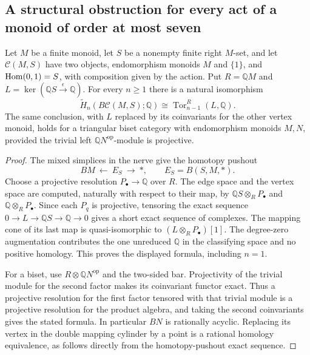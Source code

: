 \subsection{A structural obstruction for every act of a monoid of order at most seven}

\begin{lemma}
\label{C:act-cone-Tor}
Let $M$ be a finite monoid, let $S$ be a nonempty finite right
$M$-set, and let $\mathcal C(M,S)$ have two objects, endomorphism
monoids $M$ and $\{1\}$, and $\operatorname{Hom}(0,1)=S$, with composition given
by the action. Put $R=\mathbb QM$ and
$L=\ker(\mathbb QS\xrightarrow{\epsilon}\mathbb Q)$.
For every $n\geq1$ there is a natural isomorphism
\[
 \widetilde H_n(B\mathcal C(M,S);\mathbb Q)
 \cong\operatorname{Tor}^{R}_{n-1}(L,\mathbb Q).
\]
The same conclusion, with $L$ replaced by its coinvariants for the
other vertex monoid, holds for a triangular biset category with
endomorphism monoids $M,N$, provided the trivial left
$\mathbb QN^{\mathrm{op}}$-module is projective.
\end{lemma}
\begin{proof}
The mixed simplices in the nerve give the homotopy pushout
\[
 BM\ \longleftarrow\ E_S\ \longrightarrow\ *,
 \qquad E_S=B(S,M,*).
\]
Choose a projective resolution $P_\bullet\to\mathbb Q$ over $R$.
The edge space and the vertex space are computed, naturally with
respect to their map, by
$\mathbb QS\otimes_R P_\bullet$ and
$\mathbb Q\otimes_R P_\bullet$.
Since each $P_q$ is projective, tensoring the exact sequence
$0\to L\to\mathbb QS\to\mathbb Q\to0$ gives a short exact
sequence of complexes. The mapping cone of its last map is
quasi-isomorphic to $(L\otimes_R P_\bullet)[1]$.
The degree-zero augmentation contributes the one unreduced
$\mathbb Q$ in the classifying space and no positive homology.
This proves the displayed formula, including $n=1$.

For a biset, use $R\otimes\mathbb QN^{\mathrm{op}}$ and the
two-sided bar. Projectivity of the trivial module for the second
factor makes its coinvariant functor exact. Thus a projective
resolution for the first factor tensored with that trivial module
is a projective resolution for the product algebra, and taking
the second coinvariants gives the stated formula. In particular
$BN$ is rationally acyclic. Replacing its vertex in the double
mapping cylinder by a point is a rational homology equivalence,
as follows directly from the homotopy-pushout exact sequence.
\end{proof}

